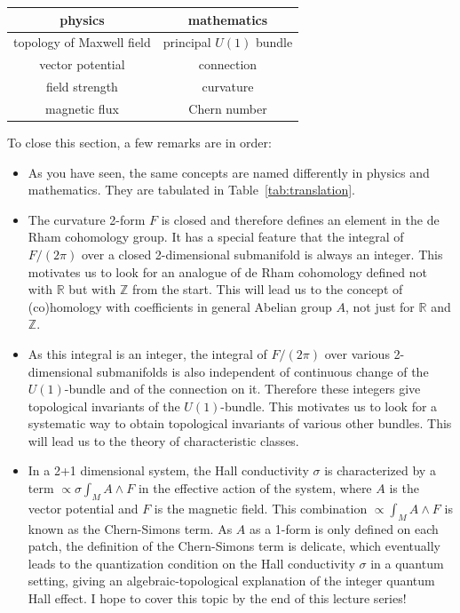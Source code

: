 \documentclass[12pt]{article}
\numberwithin{equation}{section}
\numberwithin{figure}{section}
\theoremstyle{remark}
\renewenvironment{table}[1][]{
  \begin{originaltable}[#1]
    \begin{mdframed}[linecolor=black!0,backgroundcolor=black!1]
}{
    \end{mdframed}
  \end{originaltable}
}
\def\bR{\mathbb{R}}
\def\bZ{\mathbb{Z}}
\begin{document}
\begin{table}[h]
\centering
\begin{tabular}{c|c}
physics & mathematics \\
\hline
topology of Maxwell field & principal $U(1)$ bundle \\
vector potential & connection \\
field strength & curvature\\
magnetic flux  & Chern number 
\end{tabular}
\caption{Translation table of terminologies \label{tab:translation}}
\end{table}


To close this section, a  few remarks are in order:
\begin{itemize}
\item As you have seen, the same concepts are named differently in physics and mathematics. 
They are tabulated in Table~\ref{tab:translation}.
\item The curvature 2-form $F$ is closed and therefore defines an element in the de Rham cohomology group.
It has a special feature that the integral of $F/(2\pi)$ over a closed 2-dimensional submanifold is always an integer.
This motivates us to look for an analogue of de Rham cohomology defined not with $\bR$ but with $\bZ$ from the start.
This will lead us to the concept of (co)homology with coefficients in general Abelian group $A$, not just for $\bR$ and $\bZ$.
\item As this integral is an integer, the integral of $F/(2\pi)$ over various 2-dimensional submanifolds is also independent of 
continuous change of the $U(1)$-bundle and of the connection on it.
Therefore these integers give topological invariants of the $U(1)$-bundle.
This motivates us to look for a systematic way to obtain topological invariants of various other bundles.
This will lead us to the theory of characteristic classes.
\item In a 2+1 dimensional system, 
the Hall conductivity $\sigma$ is characterized by a term 
$\propto \sigma \int_M A\wedge F$ in the effective action of the system,
where $A$ is the vector potential and $F$ is the magnetic field.
This combination $\propto \int_M A\wedge F$ is known as the Chern-Simons term.
As $A$ as a 1-form is only defined on each patch, the definition of the Chern-Simons term is delicate,
which eventually leads to the quantization condition on the Hall conductivity $\sigma$ in a quantum setting,
giving an algebraic-topological explanation of the integer quantum Hall effect.
I hope to cover this  topic by the end of this lecture series!
\end{itemize}
\end{document}
